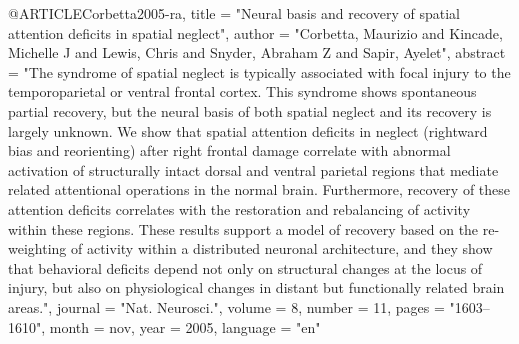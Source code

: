 @ARTICLE{Corbetta2005-ra,
	title    = "Neural basis and recovery of spatial attention deficits in
	spatial neglect",
	author   = "Corbetta, Maurizio and Kincade, Michelle J and Lewis, Chris and
	Snyder, Abraham Z and Sapir, Ayelet",
	abstract = "The syndrome of spatial neglect is typically associated with
	focal injury to the temporoparietal or ventral frontal cortex.
	This syndrome shows spontaneous partial recovery, but the neural
	basis of both spatial neglect and its recovery is largely
	unknown. We show that spatial attention deficits in neglect
	(rightward bias and reorienting) after right frontal damage
	correlate with abnormal activation of structurally intact dorsal
	and ventral parietal regions that mediate related attentional
	operations in the normal brain. Furthermore, recovery of these
	attention deficits correlates with the restoration and
	rebalancing of activity within these regions. These results
	support a model of recovery based on the re-weighting of activity
	within a distributed neuronal architecture, and they show that
	behavioral deficits depend not only on structural changes at the
	locus of injury, but also on physiological changes in distant but
	functionally related brain areas.",
	journal  = "Nat. Neurosci.",
	volume   =  8,
	number   =  11,
	pages    = "1603--1610",
	month    =  nov,
	year     =  2005,
	language = "en"
}


